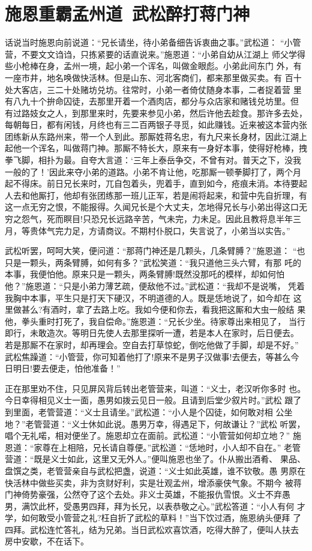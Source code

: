 \chapter{施恩重霸孟州道~武松醉打蒋门神}

话说当时施恩向前说道：“兄长请坐，待小弟备细告诉衷曲之事。”武松道：
“小管营，不要文文诌诌，只拣紧要的话直说来。”施恩道：“小弟自幼从江湖上
师父学得些小枪棒在身，孟州一境，起小弟一个诨名，叫做金眼彪。小弟此间东门
外，有一座市井，地名唤做快活林。但是山东、河北客商们，都来那里做买卖。有
百十处大客店，三二十处赌坊兑坊。往常时，小弟一者倚仗随身本事，二者捉着营
里有八九十个拚命囚徒，去那里开着一个酒肉店，都分与众店家和赌钱兑坊里。但
有过路妓女之人，到那里来时，先要来参见小弟，然后许他去趁食。那许多去处，
每朝每日，都有闲钱，月终也有三二百两银子寻觅，如此赚钱。近来被这本营内张
团练新从东路州来，带一个人到此。那厮姓蒋名忠，有九尺来长身材，因此江湖上
起他一个诨名，叫做蒋门神。那厮不特长大，原来有一身好本事，使得好枪棒，拽
拳飞脚，相扑为最。自夸大言道：‘三年上泰岳争交，不曾有对。普天之下，没我
一般的了！’因此来夺小弟的道路。小弟不肯让他，吃那厮一顿拳脚打了，两个月
起不得床。前日兄长来时，兀自包着头，兜着手，直到如今，疮痕未消。本待要起
人去和他厮打，他却有张团练那一班儿正军，若是闹将起来，和营中先自折理，有
这一点无穷之恨，不能报得。久闻兄长是个大丈夫，怎地得兄长与小弟出得这口无
穷之怨气，死而瞑目!只恐兄长远路辛苦，气未完，力未足。因此且教将息半年三
月，等贵体气完力足，方请商议。不期村仆脱口，失言说了，小弟当以实告。”

武松听罢，呵呵大笑，便问道：“那蒋门神还是几颗头，几条臂膊？”施恩道：
“也只是一颗头，两条臂膊，如何有多？”武松笑道：“我只道他三头六臂，有那
吒的本事，我便怕他。原来只是一颗头，两条臂膊!既然没那吒的模样，却如何怕
他？”施恩道：“只是小弟力薄艺疏，便敌他不过。”武松道：“我却不是说嘴，
凭着我胸中本事，平生只是打天下硬汉，不明道德的人。既是恁地说了，如今却在
这里做甚么?有酒时，拿了去路上吃。我如今便和你去，看我把这厮和大虫一般结
果他，拳头重时打死了，我自偿命。”施恩道：“兄长少坐。待家尊出来相见了，
当行即行，未敢造次。等明日先使人去那里探听一遭，若是本人在家时，后日便去。
若是那厮不在家时，却再理会。空自去打草惊蛇，倒吃他做了手脚，却是不好。”
武松焦躁道：“小管营，你可知着他打了!原来不是男子汉做事!去便去，等甚么今
日明日!要去便走，怕他准备！”

正在那里劝不住，只见屏风背后转出老管营来，叫道：“义士，老汉听你多时
也。今日幸得相见义士一面，愚男如拨云见日一般。且请到后堂少叙片时。”武松
跟了到里面，老管营道：“义士且请坐。”武松道：“小人是个囚徒，如何敢对相
公坐地？”老管营道：“义士休如此说。愚男万幸，得遇足下，何故谦让？”武松
听罢，唱个无礼喏，相对便坐了。施恩却立在面前。武松道：“小管营如何却立地？”
施恩道：“家尊在上相陪，兄长请自尊便。”武松道：“恁地时，小人却不自在。”
老管营道：“既是义士如此，这里又无外人。”便叫施恩也坐了。仆从搬出酒肴、
果品、盘馔之类，老管营亲自与武松把盏，说道：“义士如此英雄，谁不钦敬。愚
男原在快活林中做些买卖，非为贪财好利，实是壮观孟州，增添豪侠气象。不期今
被蒋门神倚势豪强，公然夺了这个去处。非义士英雄，不能报仇雪恨。义士不弃愚
男，满饮此杯，受愚男四拜，拜为长兄，以表恭敬之心。”武松答道：“小人有何
才学，如何敢受小管营之礼?枉自折了武松的草料！”当下饮过酒，施恩纳头便拜
了四拜。武松连忙答礼，结为兄弟。当日武松欢喜饮酒，吃得大醉了，便叫人扶去
房中安歇，不在话下。

